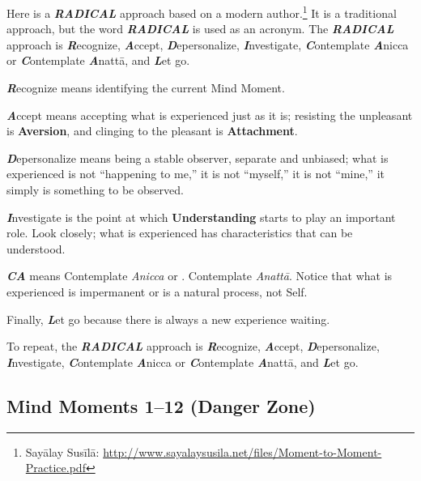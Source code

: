 Here is a \textbf{\textit{RADICAL}} approach based on a modern author.\footnote{Sayālay Susīlā: \url{http://www.sayalaysusila.net/files/Moment-to-Moment-Practice.pdf}} It is a traditional approach, but the word \textbf{\textit{RADICAL}} is used as an acronym. The \textbf{\textit{RADICAL}} approach is \textbf{\textit{R}}ecognize, \textbf{\textit{A}}ccept, \textbf{\textit{D}}epersonalize, \textbf{\textit{I}}nvestigate, \textbf{\textit{C}}ontemplate \textbf{\textit{A}}nicca or \textbf{\textit{C}}ontemplate \textbf{\textit{A}}nattā, and \textbf{\textit{L}}et go.

\pagebreak

\textbf{\textit{R}}ecognize means identifying the current Mind Moment.

\textbf{\textit{A}}ccept means accepting what is experienced just as it is; resisting the unpleasant is \textbf{Aversion}, and clinging to the pleasant is \textbf{Attachment}. 

\textbf{\textit{D}}epersonalize means being a stable observer, separate and unbiased; what is experienced is not “happening to me,” it is not “myself,” it is not “mine,” it simply is something to be observed. 

\textbf{\textit{I}}nvestigate is the point at which \textbf{Understanding} starts to play an important role. Look closely; what is experienced has characteristics that can be understood. 

\textbf{\textit{CA}} means Contemplate \textit{Anicca} or . Contemplate \textit{Anattā}. Notice that what is experienced is impermanent or is a natural process, not Self. 

Finally, \textbf{\textit{L}}et go because there is always a new experience waiting.

To repeat, the \textbf{\textit{RADICAL}} approach is \textbf{\textit{R}}ecognize, \textbf{\textit{A}}ccept, \textbf{\textit{D}}epersonalize, \textbf{\textit{I}}nvestigate, \textbf{\textit{C}}ontemplate \textbf{\textit{A}}nicca or \textbf{\textit{C}}ontemplate \textbf{\textit{A}}nattā, and \textbf{\textit{L}}et go.

\subsection*{Mind Moments 1--12 (Danger Zone)}

